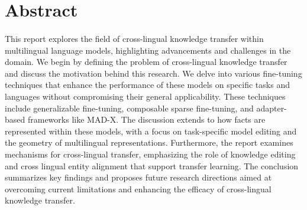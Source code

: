 \section*{\centering \textbf{\LARGE Abstract}}
\paragraph{} This report explores the field of cross-lingual knowledge transfer within multilingual language models, highlighting advancements and challenges in the domain. We begin by defining the problem of cross-lingual knowledge transfer and discuss the motivation behind this research. We delve into various fine-tuning techniques that enhance the performance of these models on specific tasks and languages without compromising their general applicability. These techniques include generalizable fine-tuning, composable sparse fine-tuning, and adapter-based frameworks like MAD-X. The discussion extends to how facts are represented within these models, with a focus on task-specific model editing and the geometry of multilingual representations. Furthermore, the report examines mechanisms for cross-lingual transfer, emphasizing the role of knowledge editing and cross lingual entity alignment that support transfer learning. The conclusion summarizes key findings and proposes future research directions aimed at overcoming current limitations and enhancing the efficacy of cross-lingual knowledge transfer. 









